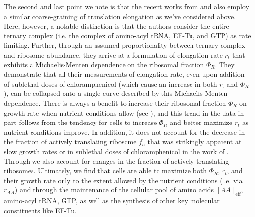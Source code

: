 The second and last point we note is that the recent works from \cite{dai2016}
and \cite{klumpp2013} also employ a similar coarse-graining of translation
elongation as we've considered above. Here, however, a notable distinction is
that the authors consider the entire ternary complex (i.e. the complex of
amino-acyl tRNA, EF-Tu, and GTP) as rate limiting. Further, through an assumed
proportionality between ternary complex and ribosome abundance, they arrive at a
formulation of elongation rate $r_t$ that exhibits a Michaelis-Menten
dependence on the ribosomal fraction $\Phi_R$. They demonstrate that all their
measurements of elongation rate, even upon addition of sublethal doses of
chloramphenicol (which cause an increase in both $r_t$ and $\Phi_R$), can be
collapsed onto a single curve described by this Michaelis-Menten dependence.
There is always a benefit to increase their ribosomal fraction $\Phi_R$ on
growth rate when nutrient conditions allow (see ), and this trend
in the data in part follows from the tendency for cells to increase $\Phi_R$ and
better maximize $r_t$ as nutrient conditions improve.  In addition, it does not
account for the decrease in the fraction of actively translating ribosome $f_a$
that was strikingly apparent at slow growth rates or in sublethal doses of
chloramphenicol in the work of \cite{dai2016}. Through  we also
account for changes in the fraction of actively translating ribosomes.
Ultimately, we find that cells are able to maximize both $\Phi_R$, $r_t$, and
their growth rate  only to the extent allowed by the nutrient conditions (i.e.
via $r_{AA}$) and through the maintenance of the cellular pool of amino acids
$[AA]_\text{eff}$, amino-acyl tRNA, GTP, as well as the synthesis of other key
molecular constituents like EF-Tu.
